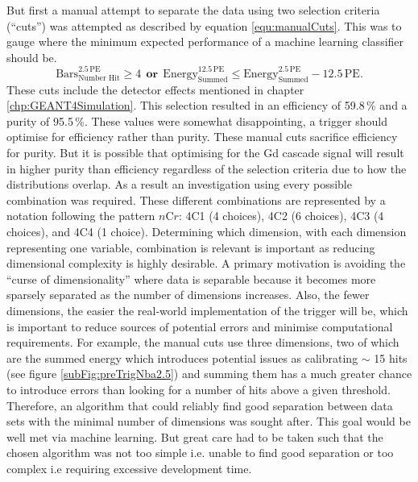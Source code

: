 But first a manual attempt to separate the data using two selection criteria (``cuts'') was attempted as described by equation \ref{equ:manualCuts}. This was to gauge where the minimum expected performance of a machine learning classifier should be.  
\begin{equation}
    \textrm{Bars}^{2.5\,\textrm{PE}}_\textrm{Number Hit} \geq 4 ~~\textbf{or}~~ \textrm{Energy}^{12.5\,\textrm{PE}}_\textrm{Summed} \leq \textrm{Energy}^{2.5\,\textrm{PE}}_\textrm{Summed} - 12.5\,\textrm{PE}. 
    \label{equ:manualCuts}
\end{equation}
These cuts include the detector effects mentioned in chapter \ref{chp:GEANT4Simulation}. This selection resulted in an efficiency of 59.8\,\% and a purity of 95.5\,\%. These values were somewhat disappointing, a trigger should optimise for efficiency rather than purity. These manual cuts sacrifice efficiency for purity. But it is possible that optimising for the Gd cascade signal will result in higher purity than efficiency regardless of the selection criteria due to how the distributions overlap. As a result an investigation using every possible combination was required. These different combinations are represented by a notation following the pattern $n$C$r$: 4C1 (4 choices), 4C2 (6 choices), 4C3 (4 choices), and 4C4 (1 choice). Determining which dimension, with each dimension representing one variable, combination is relevant is important as reducing dimensional complexity is highly desirable. A primary motivation is avoiding the ``curse of dimensionality'' \cite{taylor2019applications_cofD} where data is separable because it becomes more sparsely separated as the number of dimensions increases. Also, the fewer dimensions, the easier the real-world implementation of the trigger will be, which is important to reduce sources of potential errors and minimise computational requirements. For example, the manual cuts use three dimensions, two of which are the summed energy which introduces potential issues as calibrating $\sim$ 15 hits (see figure \ref{subFig:preTrigNba2.5}) and summing them has a much greater chance to introduce errors than looking for a number of hits above a given threshold. Therefore, an algorithm that could reliably find good separation between data sets with the minimal number of dimensions was sought after. This goal would be well met via machine learning. But great care had to be taken such that the chosen algorithm was not too simple i.e. unable to find good separation or too complex i.e requiring excessive development time. 

